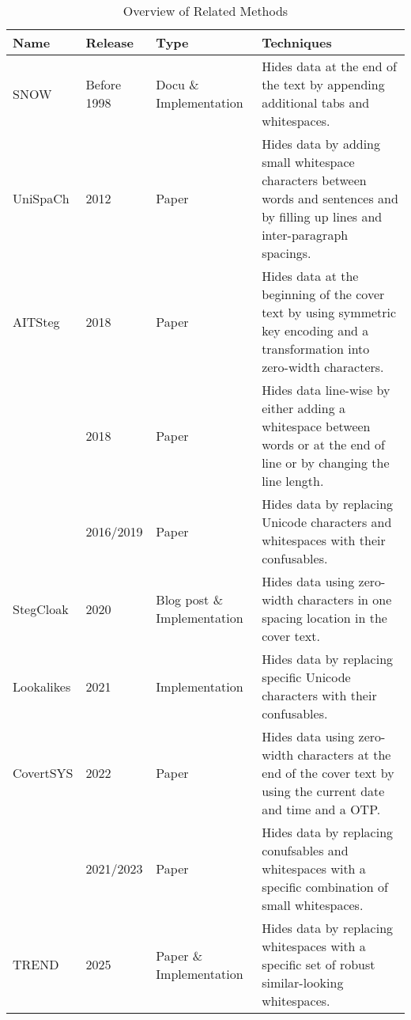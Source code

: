 	\begin{table}[!htb]
		\centering
		\caption{Overview of Related Methods}
		\label{tab:related-methods}
		\begin{tabular}{p{3.5cm} p{1.8cm} p{2.5cm} p{7cm}}
			\toprule
			Name & Release & Type & Techniques \\
			\midrule
			SNOW \citep{Kwan.2013,Kwan.2016} & Before 1998 & Docu \& Im\-ple\-ment\-ation & Hides data at the end of the text by appending additional tabs and whitespaces.\\
			UniSpaCh \citep{Por.2012} & 2012 & Paper & Hides data by adding small whitespace characters between words and sentences and by filling up lines and inter-paragraph spacings.\\
			AITSteg \citep{Ahvanooey.2018} & 2018 & Paper & Hides data at the beginning of the cover text by using symmetric key encoding and a transformation into zero-width characters.\\
			\citet{Shiu.2018} & 2018 & Paper & Hides data line-wise by either adding a whitespace between words or at the end of line or by changing the line length.\\
			\citet{Rizzo.2016,Rizzo.2019} & 2016/2019 & Paper & Hides data by replacing Unicode characters and whitespaces with their confusables.\\
			StegCloak \citep{KuroLabs.2020,Mohanasundar.2020} & 2020 & Blog post \& Im\-ple\-ment\-ation & Hides data using zero-width characters in one spacing location in the cover text.\\
			Lookalikes \citep{Thompson.2021} & 2021 & Im\-ple\-ment\-ation & Hides data by replacing specific Unicode characters with their confusables.\\
			CovertSYS \citep{Ahvanooey.2022b} & 2022 & Paper & Hides data using zero-width characters at the end of the cover text by using the current date and time and a \ac{OTP}.\\
			\citet{ShazzadUrRahman.2021,ShazzadUrRahman.2023} & 2021/2023 & Paper & Hides data by replacing conufsables and whitespaces with a specific combination of small whitespaces.\\
			\ac{TREND} \citep{FraunhoferISST.2025} & 2025 & Paper \& Im\-ple\-ment\-ation & Hides data by replacing whitespaces with a specific set of robust similar-looking whitespaces.\\
			\bottomrule
		\end{tabular}
	\end{table}
	
	\FloatBarrier